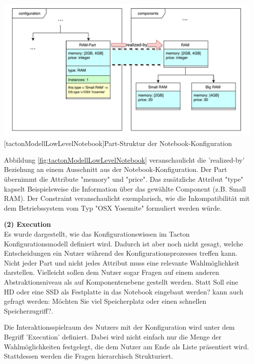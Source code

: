 \documentclass[12pt,a4paper,bibliography=totocnumbered,listof=totoc]{scrartcl}
\begin{document}
\vspace{1em}
\begin{minipage}{\linewidth}
	\centering
	\includegraphics[width=1\linewidth]{Abbildungen/tactonModellLowLevelNotebook.pdf}
	[tactonModellLowLevelNotebook]{Part-Struktur der Notebook-Konfiguration}
	\label{fig:tactonModellLowLevelNotebook}
\end{minipage}
\vspace{1em}

Abbildung \ref{fig:tactonModellLowLevelNotebook} veranschaulicht die 'realized-by' Beziehung an einem Ausschnitt aus der Notebook-Konfiguration.  Der Part übernimmt die Attribute "memory" und "price". Das zusätzliche Attribut "type" kapselt Beispielsweise die Information über das gewählte Component (z.B. Small RAM). Der Constraint veranschaulicht exemplarisch, wie die Inkompatibilität mit dem Betriebssystem vom Typ "OSX Yosemite" formuliert werden würde.

\textbf{(2) Execution}\\
Es wurde dargestellt, wie das Konfigurationswissen im Tacton Konfigurationsmodell definiert wird. Dadurch ist aber noch nicht gesagt, welche Entscheidungen ein Nutzer während des Konfigurationsprozesses treffen kann. Nicht jeder Part und nicht jedes Attribut muss eine relevante Wahlmöglichkeit darstellen. Vielleicht sollen dem Nutzer sogar Fragen auf einem anderen Abstraktionsniveau als auf Komponentenebene gestellt werden. Statt \glqq Soll eine HD oder eine SSD als Festplatte in das Notebook eingebaut werden?\grqq{} kann auch gefragt werden: \glqq Möchten Sie viel Speicherplatz oder einen schnellen Speicherzugriff?\grqq.

Die Interaktionsspielraum des Nutzers mit der Konfiguration wird unter dem Begriff 'Execution' definiert. Dabei wird nicht einfach nur die Menge der Wahlmöglichkeiten festgelegt, die dem Nutzer am Ende als Liste präsentiert wird. Stattdessen werden die Fragen hierarchisch Strukturiert.
\end{document}
